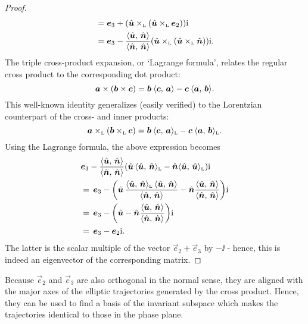 \begin{proof}
\begin{equation*}
\begin{split}
            &=\vec{e}_3 +  \qty(\lorcrossp{\uvec{u}}{\qty(\lorcrossp{\uvec{u}}{\vec{e}_2})})\ii \\
            &=\vec{e}_3 -  \frac{ \inner{\uvec{u}}{\uvec{n}} }{ \inner{\uvec{n}}{\uvec{n}} }\qty(\lorcrossp{\uvec{u}}{\qty(\lorcrossp{\uvec{u}}{\uvec{n}})})\ii.  \\
        \end{split}
    \end{equation*}
The triple cross-product expansion, or `Lagrange formula', relates the regular cross product to the corresponding dot product:
    $$ \vec{a}\times\qty(\vec{b}\times\vec{c}) = \vec{b}\:\inner{\vec{c}}{\vec{a}} - \vec{c}\:\inner{\vec{a}}{\vec{b}}. $$
This well-known identity generalizes (easily verified) to the Lorentzian counterpart of the cross- and inner products:
    $$ 
        \lorcrossp{\vec{a}}{\qty(\lorcrossp{\vec{b}}{\vec{c}})} 
       = \vec{b}\:\lorinner{\vec{c}}{\vec{a}} - \vec{c}\:\lorinner{\vec{a}}{\vec{b}}. 
    $$
Using the Lagrange formula, the above expression becomes
    \begin{equation*}
        \begin{split}
            & \vec{e}_3 - \frac{ \inner{\uvec{u}}{\uvec{n}} }{ \inner{\uvec{n}}{\uvec{n}} }\qty(\uvec{u}\,\lorinner{\uvec{u}}{\uvec{n}} - \uvec{n}\lorinner{\uvec{u}}{\uvec{u}})\ii \\
            & =\, \vec{e}_3 - \qty(\uvec{u}\,\frac{ \lorinner{\uvec{u}}{\uvec{n}} \, \inner{\uvec{u}}{\uvec{n}} }{ \inner{\uvec{n}}{\uvec{n}} } - \uvec{n}\frac{ \inner{\uvec{u}}{\uvec{n}} }{ \inner{\uvec{n}}{\uvec{n}} })\ii \\
            & =\, \vec{e}_3 - \qty(\uvec{u} - \uvec{n}\frac{ \inner{\uvec{u}}{\uvec{n}} }{ \inner{\uvec{n}}{\uvec{n}} })\ii \\
            & =\, \vec{e}_3 - \vec{e}_2\ii. 
        \end{split}
    \end{equation*}
    The latter is the scalar multiple of the vector $\vec{e}_2 + \vec{e}_3$ by $-\ii$ - hence, this is indeed an eigenvector of the corresponding matrix.
\end{proof}
Because $\vec{e}_2$ and $\vec{e}_3$ are also orthogonal in the normal sense, they are aligned with the major axes of the elliptic trajectories generated by the cross product. Hence, they can be used to find a basis of the invariant subspace which makes the trajectories identical to those in the phase plane.



